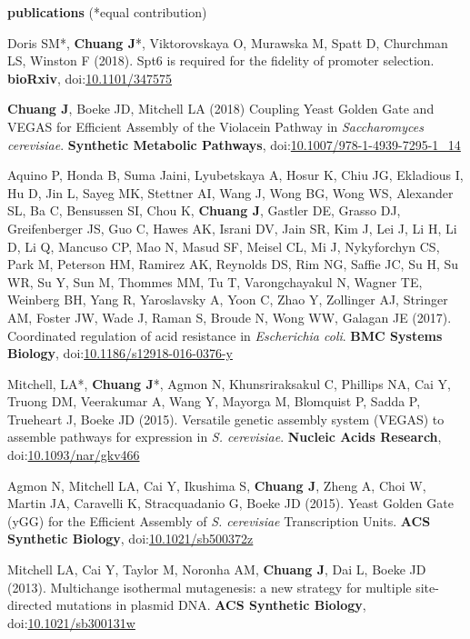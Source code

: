 \documentclass[11pt, a4paper]{article}
\begin{document}
\vspace{0.8cm}
\textbf{\Large publications} (*equal contribution)
\begin{description}[topsep=2pt, align=right, leftmargin=*, labelsep=0pt]
    \item [in review ] Doris SM*, \textbf{Chuang J}*, Viktorovskaya O, Murawska M, Spatt D, Churchman LS, Winston F (2018). Spt6 is required for the fidelity of promoter selection. \textbf{bioRxiv}, doi:\href{https://doi.org/10.1101/347575}{10.1101/347575}
    \item [2018 ] \textbf{Chuang J}, Boeke JD, Mitchell LA (2018) Coupling Yeast Golden Gate and VEGAS for Efficient Assembly of the Violacein Pathway in \textit{Saccharomyces cerevisiae}. \textbf{Synthetic Metabolic Pathways}, doi:\href{https://doi.org/10.1007/978-1-4939-7295-1_14}{10.1007/978-1-4939-7295-1\_14}
    \item [2017 ] Aquino P, Honda B, Suma Jaini, Lyubetskaya A, Hosur K, Chiu JG, Ekladious I, Hu D, Jin L, Sayeg MK, Stettner AI, Wang J, Wong BG, Wong WS, Alexander SL, Ba C, Bensussen SI, Chou K, \textbf{Chuang J}, Gastler DE, Grasso DJ, Greifenberger JS, Guo C, Hawes AK, Israni DV, Jain SR, Kim J, Lei J, Li H, Li D, Li Q, Mancuso CP, Mao N, Masud SF, Meisel CL, Mi J, Nykyforchyn CS, Park M, Peterson HM, Ramirez AK, Reynolds DS, Rim NG, Saffie JC, Su H, Su WR, Su Y, Sun M, Thommes MM, Tu T, Varongchayakul N, Wagner TE, Weinberg BH, Yang R, Yaroslavsky A, Yoon C, Zhao Y, Zollinger AJ, Stringer AM, Foster JW, Wade J, Raman S, Broude N, Wong WW, Galagan JE (2017). Coordinated regulation of acid resistance in \textit{Escherichia coli}. \textbf{BMC Systems Biology}, doi:\href{https://doi.org/10.1186/s12918-016-0376-y}{10.1186/s12918-016-0376-y}
    \item [2015 ] Mitchell, LA*, \textbf{Chuang J}*, Agmon N, Khunsriraksakul C, Phillips NA, Cai Y, Truong DM, Veerakumar A, Wang Y, Mayorga M, Blomquist P, Sadda P, Trueheart J, Boeke JD (2015). Versatile genetic assembly system (VEGAS) to assemble pathways for expression in \textit{S. cerevisiae}. \textbf{Nucleic Acids Research}, doi:\href{https://doi.org/10.1093/nar/gkv466}{10.1093/nar/gkv466}
    \item [2015 ] Agmon N, Mitchell LA, Cai Y, Ikushima S, \textbf{Chuang J}, Zheng A, Choi W, Martin JA, Caravelli K, Stracquadanio G, Boeke JD (2015). Yeast Golden Gate (yGG) for the Efficient Assembly of \textit{S. cerevisiae} Transcription Units. \textbf{ACS Synthetic Biology}, doi:\href{https://doi.org/10.1021/sb500372z}{10.1021/sb500372z}
    \item [2013 ] Mitchell LA, Cai Y, Taylor M, Noronha AM, \textbf{Chuang J}, Dai L, Boeke JD (2013). Multichange isothermal mutagenesis: a new strategy for multiple site-directed mutations in plasmid DNA. \textbf{ACS Synthetic Biology}, doi:\href{https://doi.org/10.1021/sb300131w}{10.1021/sb300131w}
\end{description}
\end{document}
